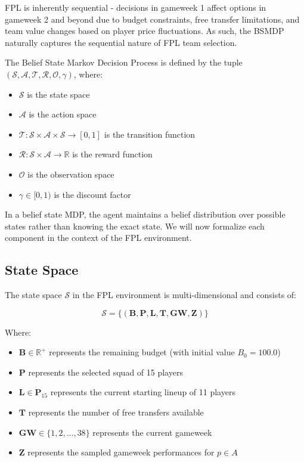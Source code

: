 FPL is inherently sequential - decisions in gameweek 1 affect options in gameweek 2 and beyond due to budget constraints, free transfer limitations, and team value changes based on player price fluctuations. As such, the BSMDP naturally captures the sequential nature of FPL team selection.

The Belief State Markov Decision Process is defined by the tuple $(\mathcal{S}, \mathcal{A}, \mathcal{T}, \mathcal{R}, \mathcal{O}, \gamma)$, where:
\begin{itemize}
    \item $\mathcal{S}$ is the state space
    \item $\mathcal{A}$ is the action space
    \item $\mathcal{T}: \mathcal{S} \times \mathcal{A} \times \mathcal{S} \rightarrow [0, 1]$ is the transition function
    \item $\mathcal{R}: \mathcal{S} \times \mathcal{A} \rightarrow \mathbb{R}$ is the reward function
    \item $\mathcal{O}$ is the observation space
    \item $\gamma \in [0, 1)$ is the discount factor
\end{itemize}

In a belief state MDP, the agent maintains a belief distribution over possible states rather than knowing the exact state. We will now formalize each component in the context of the FPL environment.

\subsection{State Space}

The state space $\mathcal{S}$ in the FPL environment is multi-dimensional and consists of:

\[\mathcal{S} = \{(\mathbf{B}, \mathbf{P}, \mathbf{L}, \mathbf{T}, \mathbf{GW}, \mathbf{Z})\}\]

Where:
\begin{itemize}
    \item $\mathbf{B} \in \mathbb{R}^+$ represents the remaining budget (with initial value $B_0 = 100.0$)
    \item $\mathbf{P}$ represents the selected squad of 15 players
    \item $\mathbf{L} \in \mathbf{P}_{15}$ represents the current starting lineup of 11 players 
    \item $\mathbf{T}$ represents the number of free transfers available
    \item $\mathbf{GW} \in \{1, 2, ..., 38\}$ represents the current gameweek
    \item $\mathbf{Z}$ represents the sampled gameweek performances for $p \in A$
\end{itemize}

